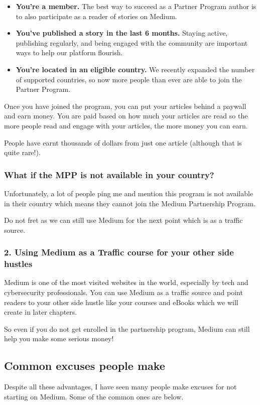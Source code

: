 \documentclass[11pt]{article}
\begin{document}
\begin{itemize}
\item \textbf{You're a member.} The best way to succeed as a Partner Program author is to also participate as a reader of stories on Medium.
\item \textbf{You've published a story in the last 6 months.} Staying active, publishing regularly, and being engaged with the community are important ways to help our platform flourish.
\item \textbf{You're located in an eligible country.} We recently expanded the number of supported countries, so now more people than ever are able to join the Partner Program.
\end{itemize}

Once you have joined the program, you can put your articles behind a paywall and earn money. You are paid based on how much your articles are read so the more people read and engage with your articles, the more money you can earn.

People have earnt thousands of dollars from just one article (although that is quite rare!).

\subsubsection*{What if the MPP is not available in your country?}
Unfortunately, a lot of people ping me and mention this program is not available in their country which means they cannot join the Medium Partnership Program.

Do not fret as we can still use Medium for the next point which is as a traffic source.

\subsubsection*{2. Using Medium as a Traffic course for your other side hustles}
Medium is one of the most visited websites in the world, especially by tech and cybersecurity professionals. You can use Medium as a traffic source and point readers to your other side hustle like your courses and eBooks which we will create in later chapters.

So even if you do not get enrolled in the partnership program, Medium can still help you make some serious money!

\subsection*{Common excuses people make}
Despite all these advantages, I have seen many people make excuses for not starting on Medium. Some of the common ones are below.
\end{document}

